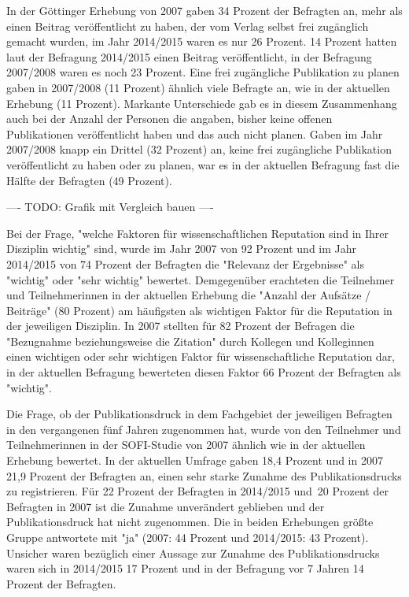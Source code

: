 In der Göttinger Erhebung von 2007 gaben 34 Prozent der Befragten an, mehr als einen Beitrag veröffentlicht zu haben, der vom Verlag selbst frei zugänglich gemacht wurden, im Jahr 2014/2015 waren es nur 26 Prozent. 14 Prozent hatten laut der Befragung 2014/2015 einen Beitrag veröffentlicht, in der Befragung 2007/2008 waren es noch 23 Prozent. Eine frei zugängliche Publikation zu planen gaben in 2007/2008 (11 Prozent) ähnlich viele Befragte an, wie in der aktuellen Erhebung (11 Prozent). Markante Unterschiede gab es in diesem Zusammenhang auch bei der Anzahl der Personen die angaben, bisher keine offenen Publikationen veröffentlicht haben und das auch nicht planen. Gaben im Jahr 2007/2008 knapp ein Drittel (32 Prozent) an, keine frei zugängliche Publikation veröffentlicht zu haben oder zu planen, war es in der aktuellen Befragung fast die Hälfte der Befragten (49 Prozent).

---- TODO: Grafik mit Vergleich bauen ----

Bei der Frage, "welche Faktoren für wissenschaftlichen Reputation sind in Ihrer Disziplin wichtig" sind, wurde im Jahr 2007 von 92 Prozent und im Jahr 2014/2015 von 74 Prozent der Befragten die "Relevanz der Ergebnisse" als "wichtig" oder "sehr wichtig" bewertet. Demgegenüber erachteten die Teilnehmer und Teilnehmerinnen in der aktuellen Erhebung die "Anzahl der Aufsätze / Beiträge" (80 Prozent) am häufigsten als wichtigen Faktor für die Reputation in der jeweiligen Disziplin. In 2007 stellten für 82 Prozent der Befragen die "Bezugnahme beziehungsweise die Zitation" durch Kollegen und Kolleginnen einen wichtigen oder sehr wichtigen Faktor für wissenschaftliche Reputation dar, in der aktuellen Befragung bewerteten diesen Faktor 66 Prozent der Befragten als "wichtig".

Die Frage, ob der Publikationsdruck in dem Fachgebiet der jeweiligen Befragten in den vergangenen fünf Jahren zugenommen hat, wurde von den Teilnehmer und Teilnehmerinnen in der SOFI-Studie von 2007 ähnlich wie in der aktuellen Erhebung bewertet. In der aktuellen Umfrage gaben 18,4 Prozent und in 2007 21,9 Prozent der Befragten an, einen sehr starke Zunahme des Publikationsdrucks zu registrieren. Für 22 Prozent der Befragten in 2014/2015 und 20 Prozent der Befragten in 2007 ist die Zunahme unverändert geblieben und der Publikationsdruck hat nicht zugenommen. Die in beiden Erhebungen größte Gruppe antwortete mit "ja" (2007: 44 Prozent und 2014/2015: 43 Prozent). Unsicher waren bezüglich einer Aussage zur Zunahme des Publikationsdrucks waren sich in 2014/2015 17 Prozent und in der Befragung vor 7 Jahren 14 Prozent der Befragten.

